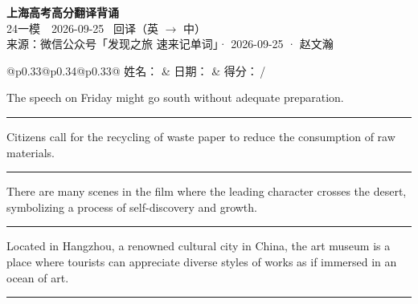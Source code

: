 \documentclass[11pt,a4paper]{article}
\newcommand{\num}[1]{\makebox[1.9em][r]{#1.}\hspace{0.3em}}
\newcommand{\wline}{\noindent\rule{\linewidth}{0.4pt}}
\begin{document}
\pagestyle{plain}
\begin{center}
{\LARGE\bfseries 上海高考高分翻译背诵 }\\[0.25em]
{\large 24一模　2026-09-25 \quad\ 回译（英 $\to$ 中）}\\[0.35em]
{\footnotesize 来源：微信公众号「发现之旅 速来记单词」· 2026-09-25 · 赵文瀚}
\end{center}

\vspace{0.4em}
\noindent\begin{tabular}{@{}p{0.33\textwidth}@{}p{0.34\textwidth}@{}p{0.33\textwidth}@{}}
姓名：\underline{\hspace{2.0cm}} & 日期：\underline{\hspace{2.0cm}} & 得分：\underline{\hspace{1.4cm}}\,/ \\
\end{tabular}

\vspace{0.5em}

\vspace{0.8em}
\num{1}The speech on Friday might go south without adequate preparation.

\vspace{0.25em}

\wline

\num{2}Citizens call for the recycling of waste paper to reduce the consumption of raw materials.

\vspace{0.25em}

\wline

\num{3}There are many scenes in the film where the leading character crosses the desert, symbolizing a process of self-discovery and growth.

\vspace{0.25em}

\wline

\num{4}Located in Hangzhou, a renowned cultural city in China, the art museum is a place where tourists can appreciate diverse styles of works as if immersed in an ocean of art.

\vspace{0.25em}

\wline
\end{document}
